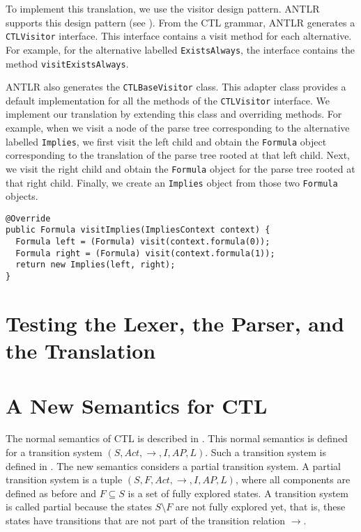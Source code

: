 \documentclass[12pt]{article}
\theoremstyle{definition}
\begin{document}
To implement this translation, we use the visitor design pattern.  ANTLR supports this design pattern (see \cite[Section~7.3]{P13}).  From the CTL grammar, ANTLR generates a \lstinline{CTLVisitor} interface.  This interface contains a visit method for each alternative.  For example, for the alternative labelled \lstinline{ExistsAlways}, the interface contains the method \lstinline{visitExistsAlways}.

ANTLR also generates the \lstinline{CTLBaseVisitor} class.  This adapter class provides a default implementation for all the methods of the \lstinline{CTLVisitor} interface.  We implement our translation by extending this class and overriding methods.  For example, when we visit a node of the parse tree corresponding to the alternative labelled \lstinline{Implies}, we first visit the left child and obtain the \lstinline{Formula} object corresponding to the translation of the parse tree rooted at that left child.  Next, we visit the right child and obtain the \lstinline{Formula} object for the parse tree rooted at that right child.  Finally, we create an \lstinline{Implies} object from those two \lstinline{Formula} objects.

\begin{lstlisting}
@Override
public Formula visitImplies(ImpliesContext context) {
  Formula left = (Formula) visit(context.formula(0));
  Formula right = (Formula) visit(context.formula(1));
  return new Implies(left, right);
}
\end{lstlisting}

\section{Testing the Lexer, the Parser, and the Translation}




\section{A New Semantics for CTL}

The normal semantics of CTL is described in \cite[Section~6.2.2]{BK08}.  This normal semantics is defined for a transition system $(S, Act, \rightarrow, I, AP, L)$.  Such a transition system is defined in \cite[Definition~2.1]{BK08}.  The new semantics considers a partial transition system.  A partial transition system is a tuple $(S, F, Act, \rightarrow, I, AP, L)$, where all components are defined as before and $F \subseteq S$ is a set of fully explored states.  A transition system is called partial because the states $S \setminus F$ are not fully explored yet, that is, these states have transitions that are not part of the transition relation $\rightarrow$.  
\end{document}
